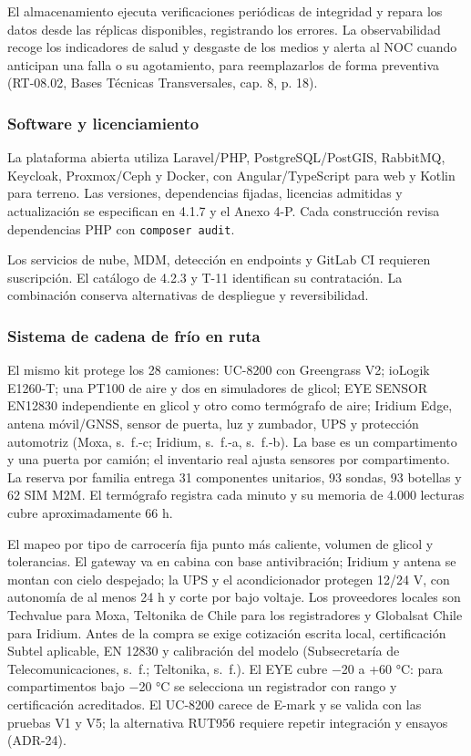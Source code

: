El almacenamiento ejecuta verificaciones periódicas de integridad y repara los datos desde las réplicas disponibles, registrando los errores. La observabilidad recoge los indicadores de salud y desgaste de los medios y alerta al NOC cuando anticipan una falla o su agotamiento, para reemplazarlos de forma preventiva (RT-08.02, Bases Técnicas Transversales, cap. 8, p. 18).

\subsubsection{Software y licenciamiento}

La plataforma abierta utiliza Laravel/PHP, PostgreSQL/PostGIS, RabbitMQ, Keycloak, Proxmox/Ceph y Docker, con Angular/TypeScript para web y Kotlin para terreno. Las versiones, dependencias fijadas, licencias admitidas y actualización se especifican en 4.1.7 y el Anexo 4-P. Cada construcción revisa dependencias PHP con \texttt{composer audit}.

Los servicios de nube, MDM, detección en endpoints y GitLab CI requieren suscripción. El catálogo de 4.2.3 y T-11 identifican su contratación. La combinación conserva alternativas de despliegue y reversibilidad.

\subsubsection{Sistema de cadena de frío en ruta}
El mismo kit protege los 28 camiones: UC-8200 con Greengrass V2; ioLogik E1260-T; una PT100 de aire y dos en simuladores de glicol; EYE SENSOR EN12830 independiente en glicol y otro como termógrafo de aire; Iridium Edge, antena móvil/GNSS, sensor de puerta, luz y zumbador, UPS y protección automotriz (Moxa, s.~f.-c; Iridium, s.~f.-a, s.~f.-b). La base es un compartimento y una puerta por camión; el inventario real ajusta sensores por compartimento. La reserva por familia entrega 31 componentes unitarios, 93 sondas, 93 botellas y 62 SIM M2M. El termógrafo registra cada minuto y su memoria de 4.000 lecturas cubre aproximadamente 66 h.

El mapeo por tipo de carrocería fija punto más caliente, volumen de glicol y tolerancias. El gateway va en cabina con base antivibración; Iridium y antena se montan con cielo despejado; la UPS y el acondicionador protegen 12/24 V, con autonomía de al menos 24 h y corte por bajo voltaje. Los proveedores locales son Techvalue para Moxa, Teltonika de Chile para los registradores y Globalsat Chile para Iridium. Antes de la compra se exige cotización escrita local, certificación Subtel aplicable, EN 12830 y calibración del modelo (Subsecretaría de Telecomunicaciones, s.~f.; Teltonika, s.~f.). El EYE cubre −20 a +60 °C: para compartimentos bajo −20 °C se selecciona un registrador con rango y certificación acreditados. El UC-8200 carece de E-mark y se valida con las pruebas V1 y V5; la alternativa RUT956 requiere repetir integración y ensayos (ADR-24).
